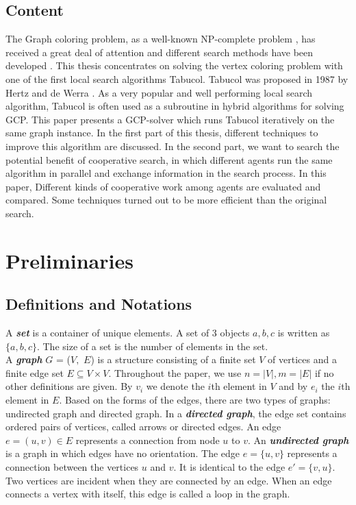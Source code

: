 \documentclass[12pt,a4paper,twoside]{scrartcl}
\numberwithin{equation}{section}
\begin{document}
\subsection{Content}
The Graph coloring problem, as a well-known NP-complete problem \cite{gary1979computers}, has received a great deal of attention and different search methods have been developed \cite{minton1992minimizing, johnson1991optimization}. This thesis concentrates on solving the vertex coloring problem with one of the first local search algorithms Tabucol. Tabucol was proposed in 1987 by Hertz and de Werra \cite{hertz1987using}. As a very popular and well performing local search algorithm, Tabucol is often used as a subroutine in hybrid algorithms for solving GCP. This paper presents a GCP-solver which runs Tabucol iteratively on the same graph instance. In the first part of this thesis, different techniques to improve this algorithm are discussed. In the second part, we want to search the potential benefit of cooperative search, in which different agents run the same algorithm in parallel and exchange information in the search process. In this paper, Different kinds of cooperative work among agents are evaluated and compared. Some techniques turned out to be more efficient than the original search.
\section{Preliminaries}
\subsection{Definitions and Notations}
A \emph{\textbf{set}} is a container of unique elements. A set of 3 objects $a, b, c$ is written as $\{a ,b ,c\}$. The size of a set is the number of elements in the set.\\
A \emph{\textbf{graph}} $G$ = ($V,$ $E$) \cite{trudeau1993introduction} is a structure consisting of a finite set $V$ of vertices and a finite edge set $E \subseteq V \times V.$ Throughout the paper, we use $n =|V|, m =|E|$ if no other definitions are given. By $v_i$ we denote the $i$th element in $V$ and by $e_i$ the $i$th element in $E$. Based on the forms of the edges, there are two types of graphs: undirected graph and directed graph. In a \emph{\textbf{directed graph}}, the edge set contains ordered pairs of vertices, called arrows or directed edges. An edge $e = (u, v)\in E$ represents a connection from node $u$ to $v$. An \emph{\textbf{undirected graph}} is a graph in which edges have no orientation. The edge $e = \{u, v\}$ represents a connection between the vertices $u$ and $v$. It is identical to the edge $e'= \{v, u\}$. Two vertices are incident when they are connected by an edge. 
When an edge connects a vertex with itself, this edge is called a loop in the graph.
\end{document}
